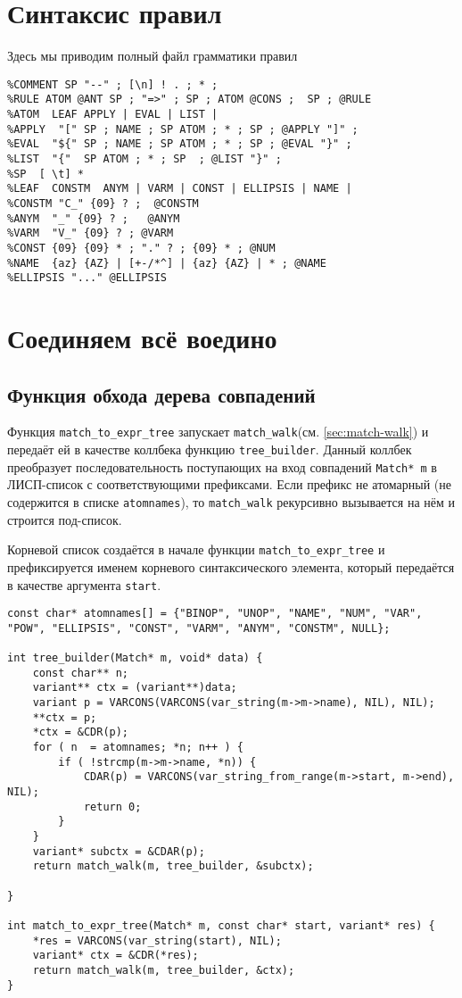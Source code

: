 \documentclass[10pt]{report}
\begin{document}
\section{Синтаксис правил}
\label{sec:rules.ppf}
Здесь мы приводим полный файл грамматики правил
\begin{lstlisting}[language=ppf, caption=rules.ppf -- Грамматика правил на $\mu Forth$]
%RULES COMMENT RULE | "\n" ; * @RULES 
%COMMENT SP "--" ; [\n] ! . ; * ; 
%RULE ATOM @ANT SP ; "=>" ; SP ; ATOM @CONS ;  SP ; @RULE
%ATOM  LEAF APPLY | EVAL | LIST | 
%APPLY  "[" SP ; NAME ; SP ATOM ; * ; SP ; @APPLY "]" ;
%EVAL  "${" SP ; NAME ; SP ATOM ; * ; SP ; @EVAL "}" ;
%LIST  "{"  SP ATOM ; * ; SP  ; @LIST "}" ;
%SP  [ \t] * 
%LEAF  CONSTM  ANYM | VARM | CONST | ELLIPSIS | NAME | 
%CONSTM "C_" {09} ? ;  @CONSTM 
%ANYM  "_" {09} ? ;   @ANYM 
%VARM  "V_" {09} ? ; @VARM 
%CONST {09} {09} * ; "." ? ; {09} * ; @NUM
%NAME  {az} {AZ} | [+-/*^] | {az} {AZ} | * ; @NAME 
%ELLIPSIS "..." @ELLIPSIS 
\end{lstlisting}

\section{Соединяем всё воедино}
\subsection{Функция обхода дерева совпадений}
Функция \texttt{match\_to\_expr\_tree} запускает \texttt{match\_walk}(см. \ref{sec:match-walk}) и передаёт
ей в качестве коллбека функцию \texttt{tree\_builder}.
Данный коллбек преобразует последовательность поступающих на вход совпадений \verb|Match* m|  в ЛИСП-список с соответствующими префиксами.
Если префикс не атомарный (не содержится в списке \texttt{atomnames}), то \texttt{match\_walk} рекурсивно вызывается на нём и строится под-список.

Корневой список создаётся в начале функции \texttt{match\_to\_expr\_tree} и префиксируется именем корневого синтаксического элемента, который передаётся в качестве аргумента \texttt{start}.
\begin{lstlisting}[firstnumber=27, caption=diff.c -- Программа для загрузки и выполнения правил]
const char* atomnames[] = {"BINOP", "UNOP", "NAME", "NUM", "VAR", "POW", "ELLIPSIS", "CONST", "VARM", "ANYM", "CONSTM", NULL};

int tree_builder(Match* m, void* data) {
	const char** n;
	variant** ctx = (variant**)data;
	variant p = VARCONS(VARCONS(var_string(m->m->name), NIL), NIL);
	**ctx = p;
	*ctx = &CDR(p);
	for ( n  = atomnames; *n; n++ ) {
		if ( !strcmp(m->m->name, *n)) {
			CDAR(p) = VARCONS(var_string_from_range(m->start, m->end), NIL);
			return 0;
		}
	}
	variant* subctx = &CDAR(p);
	return match_walk(m, tree_builder, &subctx);

}

int match_to_expr_tree(Match* m, const char* start, variant* res) {
	*res = VARCONS(var_string(start), NIL);
	variant* ctx = &CDR(*res);
	return match_walk(m, tree_builder, &ctx);
}
\end{lstlisting}
\end{document}
